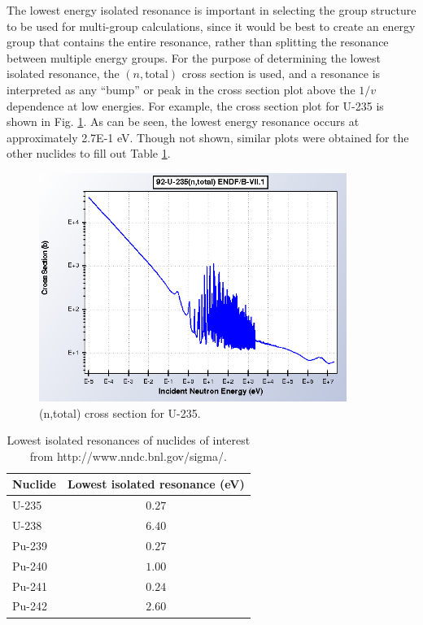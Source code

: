 \documentclass[10pt]{article}
\begin{document}
The lowest energy isolated resonance is important in selecting the group structure to be used for multi-group calculations, since it would be best to create an energy group that contains the entire resonance, rather than splitting the resonance between multiple energy groups. For the purpose of determining the lowest isolated resonance, the \((n,\textrm{total})\) cross section is used, and a resonance is interpreted as any ``bump'' or peak in the cross section plot above the \(1/v\) dependence at low energies. For example, the cross section plot for U-235 is shown in Fig. \ref{fig:U235}. As can be seen, the lowest energy resonance occurs at approximately 2.7E-1 eV. Though not shown, similar plots were obtained for the other nuclides to fill out Table \ref{table:2}.

\begin{figure}[H]
  \centering
  \includegraphics[width=10cm]{U235.pdf}
  \caption{(n,total) cross section for U-235.}
  \label{fig:U235}
\end{figure}

\begin{table}[H]
\caption{Lowest isolated resonances of nuclides of interest from http://www.nndc.bnl.gov/sigma/.}
\centering
\begin{tabular}{l c}
\hline\hline
Nuclide & Lowest isolated resonance (eV)\\ [0.5ex]
\hline
U-235 & \(0.27\)\\
U-238 & \(6.40\)\\
Pu-239 & \(0.27\)\\
Pu-240 & \(1.00\)\\
Pu-241 & \(0.24\)\\
Pu-242 & \(2.60\)\\
\hline
\end{tabular}
\label{table:2}
\end{table}
\end{document}

